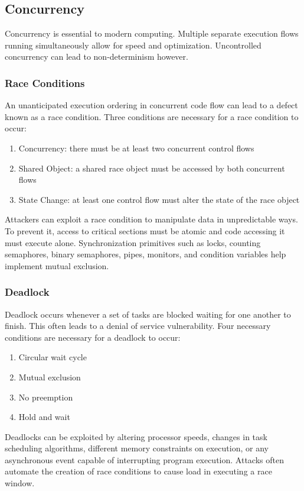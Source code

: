 \documentclass{math}
\begin{document}
\subsection*{Concurrency}
Concurrency is essential to modern computing. Multiple separate execution flows
running simultaneously allow for speed and optimization. Uncontrolled
concurrency can lead to non-determinism however.

\subsubsection*{Race Conditions}
An unanticipated execution ordering in concurrent code flow can lead to a
defect known as a race condition. Three conditions are necessary for a race
condition to occur:
\begin{enumerate}
  \item Concurrency: there must be at least two concurrent control flows
  \item Shared Object: a shared race object must be accessed by both concurrent
  flows
  \item State Change: at least one control flow must alter the state of the race
  object
\end{enumerate}
Attackers can exploit a race condition to manipulate data in unpredictable ways.
To prevent it, access to critical sections must be atomic and code accessing it
must execute alone. Synchronization primitives such as locks, counting
semaphores, binary semaphores, pipes, monitors, and condition variables help
implement mutual exclusion.

\subsubsection*{Deadlock}
Deadlock occurs whenever a set of tasks are blocked waiting for one another to
finish. This often leads to a denial of service vulnerability. Four necessary
conditions are necessary for a deadlock to occur:
\begin{enumerate}
  \item Circular wait cycle
  \item Mutual exclusion
  \item No preemption
  \item Hold and wait
\end{enumerate}
Deadlocks can be exploited by altering processor speeds, changes in task
scheduling algorithms, different memory constraints on execution, or any
asynchronous event capable of interrupting program execution. Attacks often
automate the creation of race conditions to cause load in executing a race
window.
\end{document}
